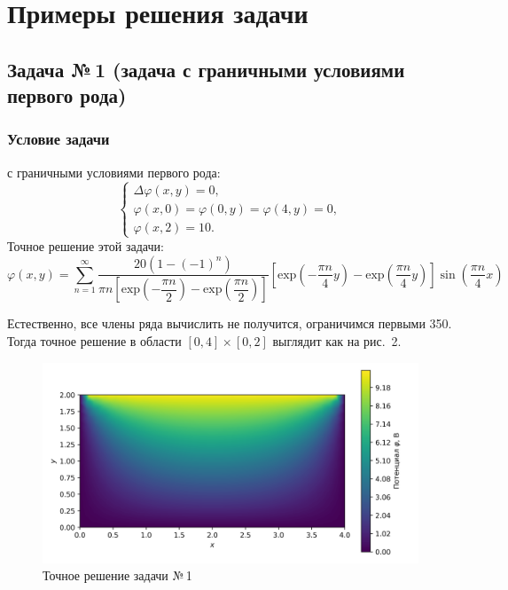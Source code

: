 \documentclass[12pt, a4paper]{article}
\begin{document}
		\section{Примеры решения задачи}
		
			\subsection{Задача №\,1 (задача с граничными условиями первого рода)}
				\subsubsection{Условие задачи}
					 с граничными условиями первого рода:
					\begin{equation*}
						\begin{cases}
							\Delta \varphi (x, y)  = 0, \\
							\varphi (x, 0) = \varphi (0, y) = \varphi (4, y) = 0, \\
							\varphi (x, 2) = 10.
						\end{cases}
					\end{equation*}
					Точное решение этой задачи:
					\begin{equation}
						\displaystyle
						\varphi\left(x, y\right) = \sum_{n = 1}^{\infty} \dfrac{20 \left(1 - (-1)^n \right)}{\pi n \left[ \mathrm{exp}\left({-\dfrac{\pi n}{2}}\right) - \mathrm{exp}\left({\dfrac{\pi n}{2}}\right)  \right]} \left[ \mathrm{exp}\left({-\dfrac{\pi n}{4}} y \right) -  \mathrm{exp}\left({\dfrac{\pi n}{4}} y \right)  \right] \sin{\left( \dfrac{\pi n}{4} x \right)}
						\label{exact_solution}
					\end{equation}	
					
					Естественно, все члены ряда вычислить не получится, ограничимся первыми 350. Тогда точное решение в области $\left[ 0 , 4\right] \times  \left[ 0 , 2\right]$ выглядит как на рис.~2.
					\begin{figure}[!h]
						\centering
						\includegraphics[width=1\textwidth]{rect_dirichlet_only_exact_sol.png}
						\caption{Точное решение задачи №\,1}
						\label{fig:rect_dom_dir_exact}
					\end{figure}
				
\end{document}
